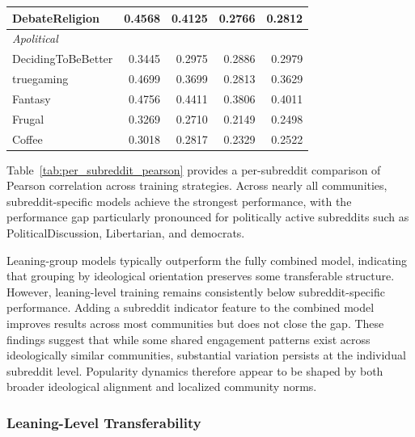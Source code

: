 \begin{longtable}[c]{lrrrr}
\quad DebateReligion      & 0.4568 & 0.4125 & 0.2766 & 0.2812 \\
\midrule
\multicolumn{5}{l}{\textit{Apolitical}} \\
\quad DecidingToBeBetter  & 0.3445 & 0.2975 & 0.2886 & 0.2979 \\
\quad truegaming          & 0.4699 & 0.3699 & 0.2813 & 0.3629 \\
\quad Fantasy             & 0.4756 & 0.4411 & 0.3806 & 0.4011 \\
\quad Frugal              & 0.3269 & 0.2710 & 0.2149 & 0.2498 \\
\quad Coffee              & 0.3018 & 0.2817 & 0.2329 & 0.2522 \\
\end{longtable}

Table~\ref{tab:per_subreddit_pearson} provides a per-subreddit comparison of Pearson correlation across training strategies. Across nearly all communities, subreddit-specific models achieve the strongest performance, with the performance gap particularly pronounced for politically active subreddits such as PoliticalDiscussion, Libertarian, and democrats.

Leaning-group models typically outperform the fully combined model, indicating that grouping by ideological orientation preserves some transferable structure. However, leaning-level training remains consistently below subreddit-specific performance. Adding a subreddit indicator feature to the combined model improves results across most communities but does not close the gap. These findings suggest that while some shared engagement patterns exist across ideologically similar communities, substantial variation persists at the individual subreddit level. Popularity dynamics therefore appear to be shaped by both broader ideological alignment and localized community norms.

\subsubsection*{Leaning-Level Transferability}

